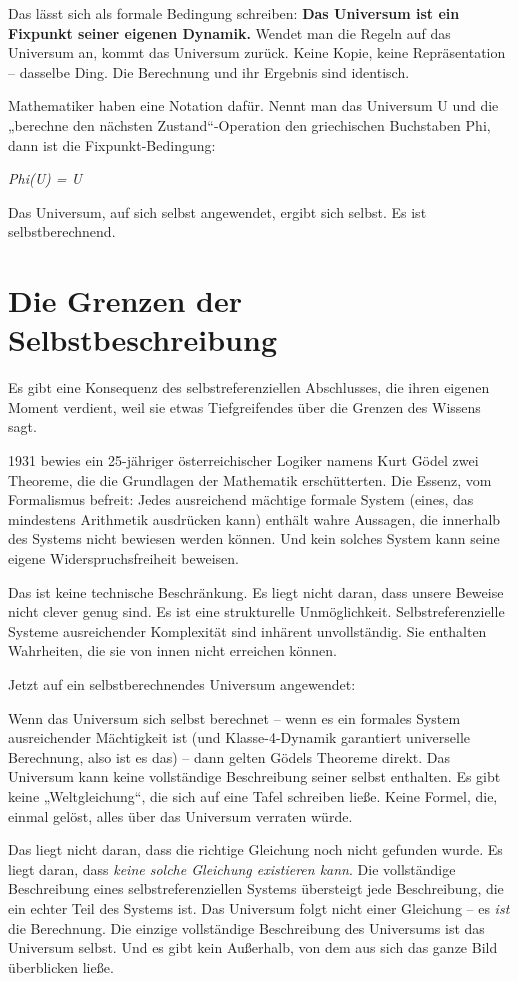 \documentclass[11pt, twoside, openright]{book}
\begin{document}
Das lässt sich als formale Bedingung schreiben: \textbf{Das Universum ist ein Fixpunkt seiner eigenen Dynamik.} Wendet man die Regeln auf das Universum an, kommt das Universum zurück. Keine Kopie, keine Repräsentation -- dasselbe Ding. Die Berechnung und ihr Ergebnis sind identisch.

Mathematiker haben eine Notation dafür. Nennt man das Universum U und die „berechne den nächsten Zustand“-Operation den griechischen Buchstaben Phi, dann ist die Fixpunkt-Bedingung:

\textit{Phi(U) = U}

Das Universum, auf sich selbst angewendet, ergibt sich selbst. Es ist selbstberechnend.


\section*{Die Grenzen der Selbstbeschreibung}

Es gibt eine Konsequenz des selbstreferenziellen Abschlusses, die ihren eigenen Moment verdient, weil sie etwas Tiefgreifendes über die Grenzen des Wissens sagt.

1931 bewies ein 25-jähriger österreichischer Logiker namens Kurt Gödel zwei Theoreme, die die Grundlagen der Mathematik erschütterten. Die Essenz, vom Formalismus befreit: Jedes ausreichend mächtige formale System (eines, das mindestens Arithmetik ausdrücken kann) enthält wahre Aussagen, die innerhalb des Systems nicht bewiesen werden können. Und kein solches System kann seine eigene Widerspruchsfreiheit beweisen.

Das ist keine technische Beschränkung. Es liegt nicht daran, dass unsere Beweise nicht clever genug sind. Es ist eine strukturelle Unmöglichkeit. Selbstreferenzielle Systeme ausreichender Komplexität sind inhärent unvollständig. Sie enthalten Wahrheiten, die sie von innen nicht erreichen können.

Jetzt auf ein selbstberechnendes Universum angewendet:

Wenn das Universum sich selbst berechnet -- wenn es ein formales System ausreichender Mächtigkeit ist (und Klasse-4-Dynamik garantiert universelle Berechnung, also ist es das) -- dann gelten Gödels Theoreme direkt. Das Universum kann keine vollständige Beschreibung seiner selbst enthalten. Es gibt keine „Weltgleichung“, die sich auf eine Tafel schreiben ließe. Keine Formel, die, einmal gelöst, alles über das Universum verraten würde.

Das liegt nicht daran, dass die richtige Gleichung noch nicht gefunden wurde. Es liegt daran, dass \textit{keine solche Gleichung existieren kann}. Die vollständige Beschreibung eines selbstreferenziellen Systems übersteigt jede Beschreibung, die ein echter Teil des Systems ist. Das Universum folgt nicht einer Gleichung -- es \textit{ist} die Berechnung. Die einzige vollständige Beschreibung des Universums ist das Universum selbst. Und es gibt kein Außerhalb, von dem aus sich das ganze Bild überblicken ließe.
\end{document}
